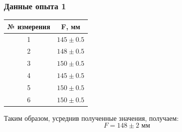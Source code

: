 \documentclass[10pt,pdf,hyperref={unicode}]{beamer}
\begin{document}
	\begin{frame}
\frametitle{Данные опыта 1} 


\begin{center}
	\begin{tabular}[H]{|c|c|}
		\hline
		№ измерения & F, мм \\
		\hline
		1 & $145 \pm 0.5$ \\
		\hline
		2 & $148 \pm 0.5$ \\
		\hline
		3 & $150 \pm 0.5$ \\
		\hline
		4 & $145 \pm 0.5$ \\
		\hline
		5 & $150 \pm 0.5$ \\
		\hline
		6 & $150 \pm 0.5$ \\
		\hline
	\end{tabular}
\end{center}
Таким образом, усреднив полученные значения, получаем:
\begin{equation*}
	F = 148 \pm 2 \text{ мм}
\end{equation*}
\end{frame}
\end{document}
